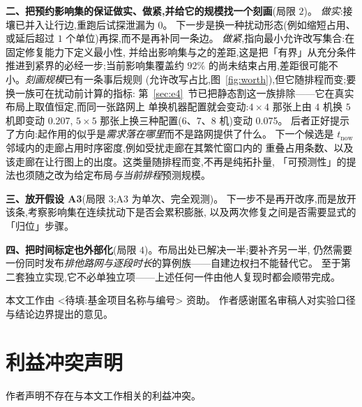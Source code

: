 \documentclass[manuscript,screen,review]{acmart}
\newcommand{\ClosureAliveFrac}{92\%}
\newcommand{\PubCloSpread}{0.207}
\newcommand{\PubCloSpreadBig}{0.075}
\newcommand{\ProbeLeaks}{0}
\begin{document}
\textbf{二、把预约影响集的保证做实、做紧,并给它的规模找一个刻画}(局限 \(2\))。
\emph{做实}:接壤已并入让行边,重跑后试探泄漏为 \ProbeLeaks。
下一步是换一种扰动形态(例如缩短占用、或延后超过 \(1\) 个单位)再探,而不是再补同一条边。
\emph{做紧},指向最小允许改写集合:在固定修复能力下定义最小性,
并给出影响集与之的差距,这是把「有界」从充分条件推进到紧界的必经一步;当前影响集覆盖约
\(\ClosureAliveFrac\) 的尚未结束占用,差距很可能不小。\emph{刻画规模}已有一条事后规则
(允许改写占比,图~\ref{fig:worth}),但它随排程而变;要换一族可在扰动前计算的指标:
第~\ref{sec:e4}~节已把静态割这一族排除——它在真实布局上取值恒定,而同一张路网上
单换机器配置就会变动:\(4\times 4\) 那张上由 \(4\) 机换 \(5\) 机即变动 \PubCloSpread,
\(5\times 5\) 那张上换三种配置(\(6\)、\(7\)、\(8\) 机)变动 \PubCloSpreadBig。
后者正好提示了方向:起作用的似乎是\emph{需求落在哪里}而不是路网提供了什么。
下一个候选是 \(t_{\mathrm{now}}\) 邻域内的走廊占用时序密度,例如受扰走廊在其繁忙窗口内的
重叠占用条数、以及该走廊在让行图上的出度。这类量随排程而变,不再是纯拓扑量,
「可预测性」的提法也须随之改为给定布局\emph{与当前排程}预测规模。

\textbf{三、放开假设 A3}(局限 \(3\);A3 为单次、完全观测)。
下一步不是再开改序,而是放开该条,考察影响集在连续扰动下是否会累积膨胀,
以及两次修复之间是否需要显式的「归位」步骤。

\textbf{四、把时间标定也外部化}(局限 \(4\))。布局出处已解决一半;要补齐另一半,
仍然需要一份同时发布\emph{排他路网与逐段时长}的算例族——自建边权扫不能替代它。
至于第二套独立实现,它不必单独立项——上述任何一件由他人复现时都会顺带完成。

\begin{acks}
本文工作由 <待填:基金项目名称与编号> 资助。
作者感谢匿名审稿人对实验口径与结论边界提出的意见。
\end{acks}

\section*{利益冲突声明}
作者声明不存在与本文工作相关的利益冲突。



\end{document}
